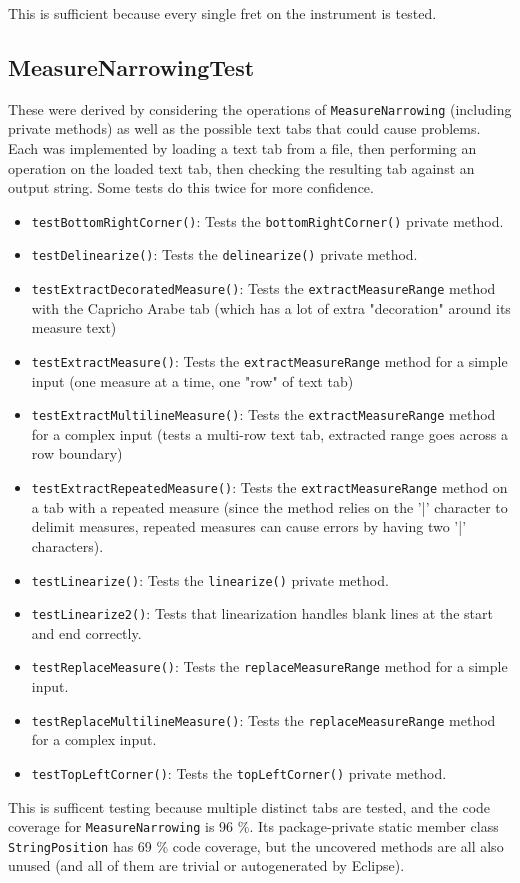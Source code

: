\documentclass[11pt]{article}
\begin{document}
This is sufficient because every single fret on the instrument is tested.

\subsection{MeasureNarrowingTest}
\label{sec:org9ebeda4}
These were derived by considering the operations of \texttt{MeasureNarrowing} (including private methods) as well as the possible text tabs that could cause problems.
Each was implemented by loading a text tab from a file, then performing an operation on the loaded text tab, then checking the resulting tab against an output string.  Some tests do this twice for more confidence.

\begin{itemize}
\item \texttt{testBottomRightCorner()}: Tests the \texttt{bottomRightCorner()} private method.
\item \texttt{testDelinearize()}: Tests the \texttt{delinearize()} private method.
\item \texttt{testExtractDecoratedMeasure()}: Tests the \texttt{extractMeasureRange} method with the Capricho Arabe tab (which has a lot of extra "decoration" around its measure text)
\item \texttt{testExtractMeasure()}: Tests the \texttt{extractMeasureRange} method for a simple input (one measure at a time, one "row" of text tab)
\item \texttt{testExtractMultilineMeasure()}: Tests the \texttt{extractMeasureRange} method for a complex input (tests a multi-row text tab, extracted range goes across a row boundary)
\item \texttt{testExtractRepeatedMeasure()}: Tests the \texttt{extractMeasureRange} method on a tab with a repeated measure (since the method relies on the '|' character to delimit measures, repeated measures can cause errors by having two '|' characters).
\item \texttt{testLinearize()}: Tests the \texttt{linearize()} private method.
\item \texttt{testLinearize2()}: Tests that linearization handles blank lines at the start and end correctly.
\item \texttt{testReplaceMeasure()}: Tests the \texttt{replaceMeasureRange} method for a simple input.
\item \texttt{testReplaceMultilineMeasure()}: Tests the \texttt{replaceMeasureRange} method for a complex input.
\item \texttt{testTopLeftCorner()}: Tests the \texttt{topLeftCorner()} private method.
\end{itemize}

This is sufficent testing because multiple distinct tabs are tested, and the code coverage for \texttt{MeasureNarrowing} is 96 \%.  Its package-private static member class \texttt{StringPosition} has 69 \% code coverage, but the uncovered methods are all also unused (and all of them are trivial or autogenerated by Eclipse).
\end{document}
